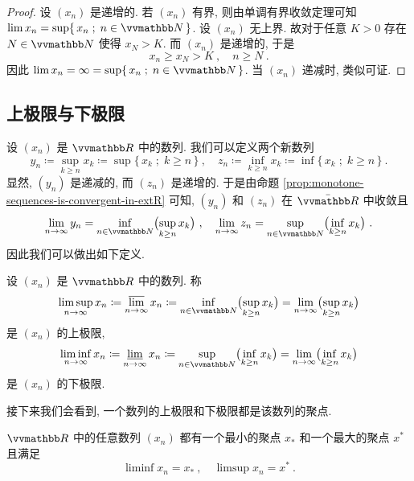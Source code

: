 \begin{proof}
    设 \((x_n)\) 是递增的. 若 \((x_n)\) 有界, 则由单调有界收敛定理可知 \(\lim x_n = \sup\{\, x_n \;;\; n \in \N \,\}\). 设 \((x_n)\) 无上界. 故对于任意 \(K > 0\) 存在 \(N \in \N\) 使得 \(x_N > K\). 而 \((x_n)\) 是递增的, 于是
    \[
        x_n \geq x_N > K\ ,\quad n \geq N\ .
    \]
    因此 \(\lim x_n = \infty = \sup\{\, x_n \;;\; n \in \N \,\}\). 当 \((x_n)\) 递减时, 类似可证.
\end{proof}

\subsection{上极限与下极限}

设 \((x_n)\) 是 \(\R\) 中的数列. 我们可以定义两个新数列
\[
    y_n \coloneqq \sup_{k \geq n} x_k \coloneqq \sup\{\, x_k \;;\; k \geq n \,\}\ ,\quad z_n \coloneqq \inf_{k \geq n} x_k \coloneqq \inf\{\, x_k \;;\; k \geq n \,\}\ .
\]
显然, \((y_n)\) 是递减的, 而 \((z_n)\) 是递增的. 于是由命题 \ref{prop:monotone-sequences-is-convergent-in-extR} 可知, \((y_n)\) 和 \((z_n)\) 在 \(\bar \R\) 中收敛且
\[
    \lim_{n \to \infty} y_n = \inf_{n \in \N} \bigl(\sup_{k \geq n} x_k\bigr)\ ,\quad \lim_{n \to \infty} z_n = \sup_{n \in \N} \bigl(\inf_{k \geq n} x_k\bigr)\ .
\]
因此我们可以做出如下定义.

\begin{definition}[上极限与下极限]
    设 \((x_n)\) 是 \(\R\) 中的数列. 称
    \[
        \limsup_{n \to \infty} x_n \coloneqq \upperlim_{n \to \infty} x_n \coloneqq \inf_{n \in \N} \bigl(\sup_{k \geq n} x_k\bigr) = \lim_{n \to \infty} \bigl(\sup_{k \geq n} x_k\bigr)
    \]
    是 \((x_n)\) 的上极限,
    \[
        \liminf_{n \to \infty} x_n \coloneqq \underlim_{n \to \infty} x_n \coloneqq \sup_{n \in \N} \bigl(\inf_{k \geq n} x_k\bigr) = \lim_{n \to \infty} \bigl(\inf_{k \geq n} x_k\bigr)
    \]
    是 \((x_n)\) 的下极限.
\end{definition}

接下来我们会看到, 一个数列的上极限和下极限都是该数列的聚点.

\begin{theorem}\label{thm:limit-superior-and-inferior-with-cluster-point}
    \(\R\) 中的任意数列 \((x_n)\) 都有一个最小的聚点 \(x_\ast\) 和一个最大的聚点 \(x^\ast\) 且满足
    \[
        \liminf x_n = x_\ast\ ,\quad \limsup x_n = x^\ast\ .
    \]
\end{theorem}

